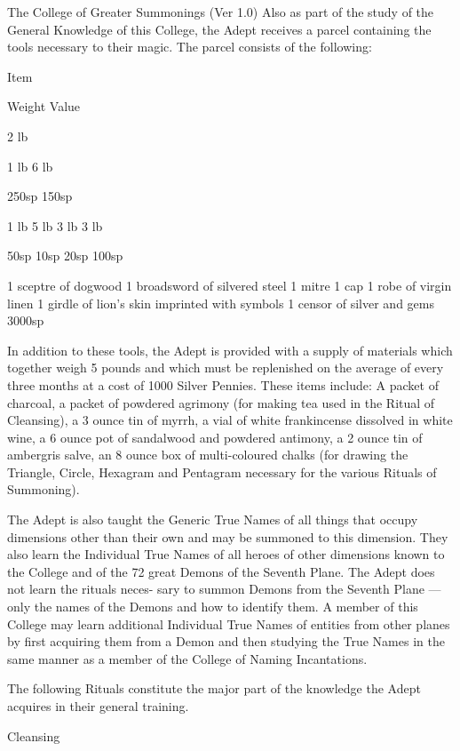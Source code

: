 \begin{Chapter}{The College of Greater Summonings (Ver 1.0)}
Also as part of the study of the General Knowledge of this College,
the Adept receives a parcel containing the tools necessary to their
magic.  The parcel consists of the following:

Item 

Weight  Value 

2 lb 

1 lb 
6 lb 

250sp 
150sp 

1 lb 
5 lb 
3 lb 
3 lb 

50sp 
10sp 
20sp 
100sp 

1 sceptre of dogwood 
1 broadsword of silvered 
steel 
1 mitre 
1 cap 
1 robe of virgin linen 
1 girdle of lion’s skin imprinted with symbols 
1 censor of silver and gems 
3000sp 

In addition to these tools, the Adept is provided with a supply of
materials which together weigh 5 pounds and which must be replenished
on the average of every three months at a cost of 1000 Silver Pennies.
These items include: A packet of charcoal, a packet of powdered
agrimony (for making tea used in the Ritual of Cleansing), a 3 ounce
tin of myrrh, a vial of white frankincense dissolved in white wine, a
6 ounce pot of sandalwood and powdered antimony, a 2 ounce tin of
ambergris salve, an 8 ounce box of multi-coloured chalks (for drawing
the Triangle, Circle, Hexagram and Pentagram necessary for the various
Rituals of Summoning).

The Adept is also taught the Generic True Names of all things that
occupy dimensions other than their own and may be summoned to this
dimension.  They also learn the Individual True Names of all heroes of
other dimensions known to the College and of the 72 great Demons of
the Seventh Plane.  The Adept does not learn the rituals neces- sary
to summon Demons from the Seventh Plane — only the names of the Demons
and how to identify them.  A member of this College may learn
additional Individual True Names of entities from other planes by
first acquiring them from a Demon and then studying the True Names in
the same manner as a member of the College of Naming Incantations.

The following Rituals constitute the major part of the knowledge the
Adept acquires in their general training.

\begin{ritual}[Q-1]{Cleansing}


\end{ritual}
\end{Chapter}

